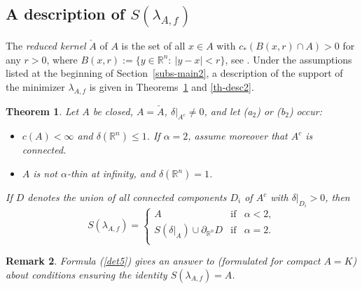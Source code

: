 \documentclass[12pt,a4paper,reqno]{amsart} %
\theoremstyle{lause}
\theoremstyle{maaritelma}
\theoremstyle{lause}
\newtheorem{theorem}{Theorem}[section]
\theoremstyle{maaritelma}
\newtheorem{remark}[theorem]{Remark}
\numberwithin{equation}{section}
\begin{document}
\subsection{A description of $S(\lambda_{A,f})$}\label{sec-descr} The {\it reduced kernel} $\check{A}$ of $A$ is the set of all $x\in A$ with $c_*(B(x,r)\cap A)>0$ for any $r>0$, where $B(x,r):=\{y\in\mathbb R^n:\ |y-x|<r\}$, see \cite[p.~164]{L}. Under the assumptions listed at the beginning of Section~\ref{subs-main2}, a description of the support of the minimizer $\lambda_{A,f}$
is given in Theorems~\ref{th-desc} and \ref{th-desc2}.

\begin{theorem}\label{th-desc} Let $A$ be closed, $A=\check{A}$,
$\delta|_{A^c}\ne0$, and let {\rm(a$_2$)} or {\rm(b$_2$)} occur:
\begin{itemize}
  \item [{\rm(a$_2$)}] $c(A)<\infty$ and $\delta(\mathbb R^n)\leqslant1$. If $\alpha=2$, assume moreover that $A^c$ is connected.
  \item [{\rm(b$_2$)}] $A$ is not $\alpha$-thin at infinity, and $\delta(\mathbb R^n)=1$.
\end{itemize}
If\/ $D$ denotes the union of all connected components\/ $D_i$ of\/ $A^c$ with\/ $\delta|_{D_i}>0$, then
\begin{equation}\label{det5}
 S(\lambda_{A,f})=\left\{
\begin{array}{cll} A&\text{if}&\alpha<2,\\
S(\delta|_A)\cup\partial_{\mathbb R^n}D&\text{if}&\alpha=2.\\ \end{array} \right.
\end{equation}
\end{theorem}

\begin{remark}\label{O}Formula (\ref{det5}) gives an answer to \cite[p.~284, Open question~2.1]{O} (formulated for compact $A=K$) about conditions ensuring the identity $S(\lambda_{A,f})=A$.\end{remark}
\end{document}
